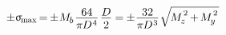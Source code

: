 \documentclass[14pt]{extarticle}
\begin{document}
\[
\pm \upsigma_{\hspace{-0.2ex}\scalebox{.75}{max}} \hspace{-.25ex}
= \hspace{-.2ex} \pm \hspace{.1ex} M_{\hspace{-0.1ex}\scalebox{.8}{$b$}} \hspace{.2ex}
\displaystyle\frac{\raisebox{-.2em}{$64$}}{\pi \hspace{-0.1ex} D^{\hspace{.1ex}4}} \hspace{.25ex} \displaystyle\frac{\raisebox{-.2em}{$D$}}{2}
\hspace{-.1ex}= \hspace{-.1ex}
\pm \hspace{.1ex} \displaystyle\frac{\raisebox{-.2em}{$32$}}{\pi \hspace{-0.1ex} D^{\hspace{.1ex}3}} \hspace{.1ex}
\sqrt{\hspace{-0.2ex}M_{\hspace{-0.1ex}\scalebox{.8}{$z$}}^{\hspace{.2ex}\raisebox{.2em}{$\scriptstyle 2$}} \hspace{-0.2ex}+\hspace{-0.2ex} M_{\hspace{-0.1ex}\scalebox{.8}{$y$}}^{\hspace{.2ex}\raisebox{.2em}{$\scriptstyle 2$}}\hspace{.2ex}}
\]
\end{document}
